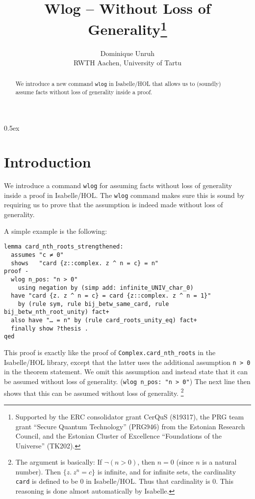 \documentclass[11pt,a4paper]{article}
\begin{document}
\title{Wlog -- Without Loss of Generality\thanks{Supported by the ERC consolidator grant CerQuS (819317), the PRG team grant “Secure Quantum Technology” (PRG946) from the Estonian Research Council, and the Estonian Cluster of Excellence ``Foundations of the Universe'' (TK202).}}
\author{Dominique Unruh\\
 \footnotesize RWTH Aachen, University of Tartu}
\maketitle

\begin{abstract}
  We introduce a new command \texttt{wlog} in Isabelle/HOL that allows us to (soundly) assume
  facts without loss of generality inside a proof.
\end{abstract}

\tableofcontents

\parindent 0pt\parskip 0.5ex

\section{Introduction}

We introduce a command \texttt{wlog} for assuming facts without loss of generality inside a proof in Isabelle/HOL.
The \texttt{wlog} command makes sure this is sound by requiring us to prove that the assumption is indeed made without loss of generality.

A simple example is the following:
\begin{verbatim}
lemma card_nth_roots_strengthened:
  assumes "c ≠ 0"
  shows   "card {z::complex. z ^ n = c} = n"
proof -
  wlog n_pos: "n > 0"
    using negation by (simp add: infinite_UNIV_char_0)
  have "card {z. z ^ n = c} = card {z::complex. z ^ n = 1}"
    by (rule sym, rule bij_betw_same_card, rule bij_betw_nth_root_unity) fact+
  also have "… = n" by (rule card_roots_unity_eq) fact+
  finally show ?thesis .
qed
\end{verbatim}

This proof is exactly like the proof of \verb|Complex.card_nth_roots| in the Isabelle/HOL library,
except that the latter uses the additional assumption \texttt{n > 0} in the theorem statement.
We omit this assumption and instead state that it can be assumed without loss of generality.
(\verb|wlog n_pos: "n > 0"|)
The next line then shows that this can be assumed without loss of generality.%
\footnote{The argument is basically:
  If $\lnot(n>0)$, then $n=0$ (since $n$ is a natural number).
  Then $\{z.\ z^n = c\}$ is infinite, and for infinite sets, the cardinality \texttt{card}
  is defined to be $0$ in Isabelle/HOL.
  Thus that cardinality is $0$.
  This reasoning is done almost automatically by Isabelle.}
\end{document}
